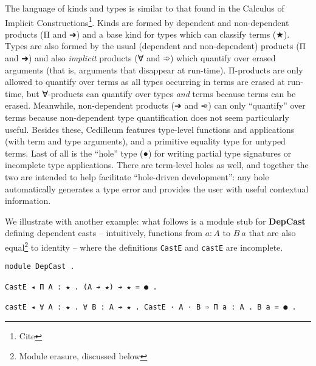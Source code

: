 \documentclass{article}
\begin{document}
The language of kinds and types is similar to that found in the Calculus of
Implicit Constructions\footnote{Cite}. Kinds are formed by dependent and
non-dependent products (Π and ➔) and a base kind for types which can classify
terms (★). Types are also formed by the usual (dependent and non-dependent)
products (Π and ➔) and also \textit{implicit} products (∀ and ➾) which quantify
over erased arguments (that is, arguments that disappear at run-time).
Π-products are only allowed to quantify over terms as all types occurring in
terms are erased at run-time, but ∀-products can quantify over types
\textit{and} terms because terms can be erased. Meanwhile, non-dependent
products (➔ and ➾) can only ``quantify'' over terms because non-dependent type
quantification does not seem particularly useful. Besides these, Cedilleum
features type-level functions and applications (with term and type arguments),
and a primitive equality type for untyped terms. Last of all is the ``hole''
type (●) for writing partial type signatures or incomplete type applications.
There are term-level holes as well, and together the two are intended to help
facilitate ``hole-driven development'': any hole automatically generates a type
error and provides the user with useful contextual information.

We illustrate with another example: what follows is a module stub for
\textbf{DepCast} defining dependent casts -- intuitively, functions from $a : A$
to $B\ a$ that are also equal\footnote{Module erasure, discussed below} to
identity -- where the definitions \texttt{CastE} and \texttt{castE} are
incomplete.

\begin{verbatim}
module DepCast .

CastE ◂ Π A : ★ . (A ➔ ★) ➔ ★ = ● .

castE ◂ ∀ A : ★ . ∀ B : A ➔ ★ . CastE · A · B ➾ Π a : A . B a = ● .
\end{verbatim}
\end{document}
